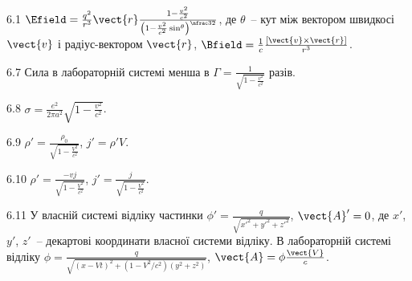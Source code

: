 \protect \section *{}
\begin{Solution}{6.{1}}
	$\Efield = \frac{q^2}{r^3}\vect{r} \frac{1 - \frac{v^2}{c^2}}{ \left( 1 - \frac{v^2}{c^2}\sin^\theta \right)^{\nfrac32}}$, де $\theta$~-- кут між вектором швидкосі $\vect{v}$ і радіус-вектором $\vect{r}$, $\Bfield = \frac1c \frac{\left[ \vect{v}\times\vect{r}\right] }{r^3}$.
\end{Solution}
\begin{Solution}{6.{7}}
	Сила в лабораторній системі менша в $\Gamma = \frac{1}{\sqrt{1- \frac{v^2}{c^2}}}$ разів.
\end{Solution}
\begin{Solution}{6.{8}}
	$\sigma  = \frac{e^2}{2\pi a^2}\sqrt{1 - \frac{v^2}{c^2}}$.
\end{Solution}
\begin{Solution}{6.{9}}
	$\rho' = \frac{\rho_0}{\sqrt{1 - \frac{V^2}{c^2}}}$, $j' = \rho' V$.
\end{Solution}
\begin{Solution}{6.{10}}
	$\rho' = \frac{- v j}{\sqrt{1 - \frac{V^2}{c^2}}}$, $j' = \frac{j}{\sqrt{1 - \frac{V^2}{c^2}}}$.
\end{Solution}
\begin{Solution}{6.{11}}
	У власній системі відліку частинки $\phi'  = \frac{q}{\sqrt{x'^2 + y'^2 + z'^2}}$, $\vect{A}' = 0$, де $x'$, $y'$, $z'$~-- декартові координати власної системи відліку.
	В лабораторній системі відліку $\phi = \frac{q}{\sqrt{(x - Vt)^2 + \left( 1 - V^2/c^2\right)(y^2 + z^2) }}$, $\vect{A} = \phi\frac{\vect{V}}{c}$.
\end{Solution}

